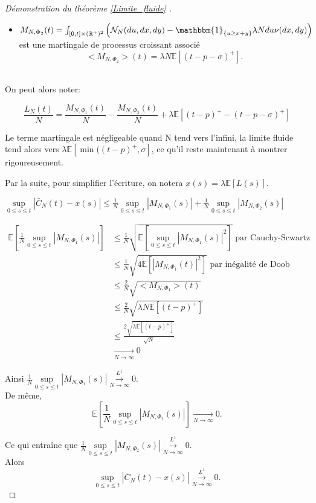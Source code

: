 \documentclass[12pt,a4paper]{article}
\newcommand{\E}[1]{\mathbb{E}\left[ #1 \right]}
\newcommand{\R}{\mathbb{R}}
\newcommand{\1}[1]{\mathbbm{1}_{\{#1\}} }
\theoremstyle{definition}
\begin{document}
{\begin{proof}[Démonstration du théorème \ref{Limite_fluide} ]
\begin{itemize}
  
\item  $M_{N,\Phi_2}(t) = \int_{[0,t]\times (\R^+)^2}  \left(\mathcal{N}_N(du,dx,dy)-\1{u\geq x+y }\lambda N du \nu(dx,dy)\right)$ est une martingale de processus croissant associé \\
$$<M_{N,\Phi_2}>(t) = \lambda N \E{(t-p-\sigma)^+}.$$\\
\end{itemize}
On peut alors noter:

$$\frac{L_N(t)}{N} = \frac{M_{N,\Phi_1}(t)}{N} - \frac{M_{N,\Phi_2}(t)}{N} + \lambda  \E{(t-p)^+-(t-p-\sigma)^+}$$

Le terme martingale est négligeable quand N tend vers l'infini, la limite fluide tend alors vers $\lambda  \E{\min((t-p)^+,\sigma}$, ce qu'il reste maintenant à montrer rigoureusement.

Par la suite, pour simplifier l'écriture, on notera $x(s) = \lambda \E{L(s)}$.

$\underset{0\leq s \leq t}{\sup} |\bar{C}_N(t)-x(s)| \leq \frac{1}{N}\underset{0\leq s \leq t}{\sup} |M_{N,\Phi_1}(s)| + \frac{1}{N}\underset{0\leq s \leq t}{\sup} |M_{N,\Phi_2}(s)| $

\begin{align*}
\E{\frac{1}{N}\underset{0\leq s \leq t}{\sup} |M_{N,\Phi_1}(s)|} &\leq \frac{1}{N}\sqrt{\E{\underset{0\leq s \leq t}{\sup} |M_{N,\Phi_1}(s)|^2}} \text{ par Cauchy-Scwartz}\\
& \leq \frac{1}{N}\sqrt{4 \E{|M_{N,\Phi_1}(t)|^2}}  \text{ par inégalité de Doob}\\
& \leq \frac{2}{N}\sqrt{<M_{N,\Phi_1}>(t)}\\
&\leq \frac{2}{N}\sqrt{ \lambda N \E{(t-p)^+}}\\
&\leq \frac{2\sqrt{ \lambda \E{(t-p)^+}}}{\sqrt{N}}\\
& \underset{N \to \infty}{\to} 0
\end{align*}


Ainsi $\frac{1}{N}\underset{0\leq s \leq t}{\sup} |M_{N,\Phi_1}(s)|\overset{L^1}{\underset{N \to \infty}{\to}} 0$.\\
 
De même, $$\E{\frac{1}{N}\underset{0\leq s \leq t}{\sup} |M_{N,\Phi_2}(s)|} \underset{N \to \infty}{\to} 0.$$

Ce qui entraîne que $\frac{1}{N}\underset{0\leq s \leq t}{\sup} |M_{N,\Phi_2}(s)|\overset{L^1}{\underset{N \to \infty}{\to}} 0.$\\


Alors $$ \underset{0\leq s \leq t}{\sup} |\bar{C}_N(t)-x(s)|\overset{L^1}{\underset{N \to \infty}{\to}} 0.$$



\end{proof}}
\end{document}
